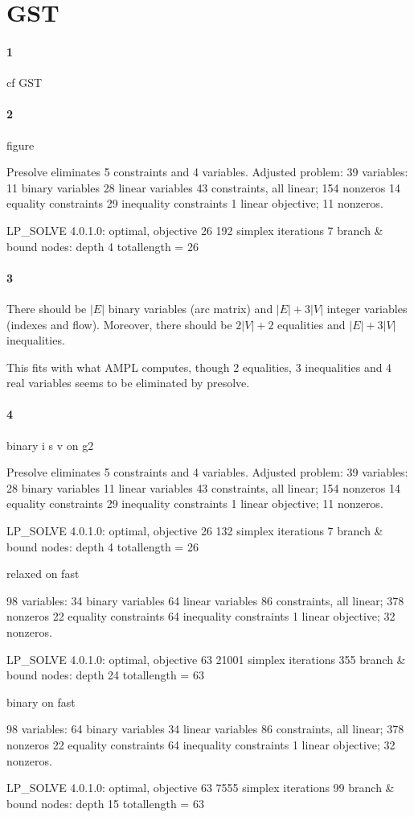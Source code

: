 \documentclass{article}
\begin{document}
\section{GST}

\paragraph{1}

cf GST

\paragraph{2}

figure

Presolve eliminates 5 constraints and 4 variables.
Adjusted problem:
39 variables:
	11 binary variables
	28 linear variables
43 constraints, all linear; 154 nonzeros
	14 equality constraints
	29 inequality constraints
1 linear objective; 11 nonzeros.

LP_SOLVE 4.0.1.0: optimal, objective 26
192 simplex iterations
7 branch \& bound nodes: depth 4
totallength = 26

\paragraph{3}

There should be $|E|$ binary variables (arc matrix) and $|E|+3|V|$ integer variables (indexes and flow). Moreover, there should be $2|V|+2$ equalities and $|E|+3|V|$ inequalities.

This fits with what AMPL computes, though 2 equalities, 3 inequalities and 4 real variables seems to be eliminated by presolve.

\paragraph{4}

binary i s v on g2

Presolve eliminates 5 constraints and 4 variables.
Adjusted problem:
39 variables:
	28 binary variables
	11 linear variables
43 constraints, all linear; 154 nonzeros
	14 equality constraints
	29 inequality constraints
1 linear objective; 11 nonzeros.

LP_SOLVE 4.0.1.0: optimal, objective 26
132 simplex iterations
7 branch \& bound nodes: depth 4
totallength = 26

relaxed on fast

98 variables:
	34 binary variables
	64 linear variables
86 constraints, all linear; 378 nonzeros
	22 equality constraints
	64 inequality constraints
1 linear objective; 32 nonzeros.

LP_SOLVE 4.0.1.0: optimal, objective 63
21001 simplex iterations
355 branch \& bound nodes: depth 24
totallength = 63

binary on fast

98 variables:
	64 binary variables
	34 linear variables
86 constraints, all linear; 378 nonzeros
	22 equality constraints
	64 inequality constraints
1 linear objective; 32 nonzeros.

LP_SOLVE 4.0.1.0: optimal, objective 63
7555 simplex iterations
99 branch \& bound nodes: depth 15
totallength = 63
\end{document}
